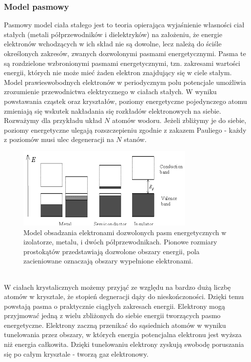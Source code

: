 \documentclass[paper=a4, fontsize=12pt]{scrartcl}
\begin{document}
\subsubsection{Model pasmowy}
Pasmowy model ciała stałego jest to teoria opierająca wyjaśnienie własności ciał stałych (metali półprzewodników i dielektryków) na założeniu, że energie elektronów wchodzących w ich skład nie są dowolne, lecz należą do ściśle określonych zakresów, zwanych dozwolonymi pasmami energetycznymi. Pasma te są rozdzielone wzbronionymi pasmami energetycznymi, tzn. zakresami wartości energii, których nie może mieć żaden elektron znajdujący się w ciele stałym. Model prawieswobodnych elektronów w periodycznym polu potencjale umożliwia zrozumienie przewodnictwa elektrycznego w ciałach stałych. W wyniku powstawania cząstek oraz kryształów, poziomy energetyczne pojedynczego atomu zmieniają się wskutek nakładania się rozkładów elektronowych na siebie. Rozważymy dla przykładu układ $N$ atomów wodoru. Jeżeli zbliżymy je do siebie, poziomy energetyczne ulegają rozszczepieniu zgodnie z zakazem Pauliego - każdy z poziomów musi ulec degeneracji na $N$ stanów.\\
\begin{figure}[h!]
\centering
\includegraphics[width=0.7\linewidth]{pasm}
\caption{Model obsadzania elektronami dozwolonych pasm energetycznych w izolatorze, metalu, i dwóch półprzewodnikach. Pionowe rozmiary prostokątów przedstawiają dozwolone obszary energii, pola zacieniowane oznaczają obszary wypełnione elektronami.}
\label{fig:pasm}
\end{figure}\\
W ciałach krystalicznych możemy przyjąć ze względu na bardzo dużą liczbę atomów w krysztale, że stopień degneracji dąży do nieskończoności. Dzięki temu powstają pasma o praktycznie ciągłych zakresach energii. Elektrony mogą przyjmować jedną z wielu zbliżonych do siebie energii tworzących pasmo energetyczne. Elektrony zaczną przenikać do sąsiednich atomów w wyniku tunelowania przez obszary, w których energia potencjalna elektronu jest wyższa niż energia całkowita. Dzięki tunelowaniu elektrony zyskują swobodę poruszania się po całym krysztale - tworzą gaz elektronowy.\\
\end{document}
